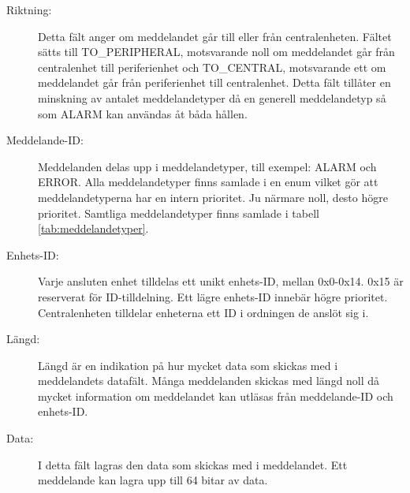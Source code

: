 \documentclass[a4paper]{article}
\begin{document}
\begin{description}
    \item[Riktning:] Detta fält anger om meddelandet går till eller från centralenheten.
    Fältet sätts till TO\_PERIPHERAL, motsvarande noll om meddelandet går från centralenhet till periferienhet och TO\_CENTRAL, motsvarande ett om meddelandet går från periferienhet till centralenhet.
    Detta fält tillåter en minskning av antalet meddelandetyper då en generell meddelandetyp så som ALARM kan användas åt båda hållen.

    \item[Meddelande-ID:] Meddelanden delas upp i meddelandetyper, till exempel: ALARM och ERROR. Alla meddelandetyper finns samlade i en enum vilket gör att meddelandetyperna har en intern prioritet. Ju närmare noll, desto högre prioritet. Samtliga meddelandetyper finns samlade i tabell \ref{tab:meddelandetyper}.

    \item[Enhets-ID:] Varje ansluten enhet tilldelas ett unikt enhets-ID, mellan 0x0-0x14. 0x15 är reserverat för ID-tilldelning. Ett lägre enhets-ID innebär högre prioritet.
    Centralenheten tilldelar enheterna ett ID i ordningen de anslöt sig i.

    \item[Längd:] Längd är en indikation på hur mycket data som skickas med i meddelandets datafält.
    Många meddelanden skickas med längd noll då mycket information om meddelandet kan utläsas från meddelande-ID och enhets-ID.

    \item[Data:] I detta fält lagras den data som skickas med i meddelandet. Ett meddelande kan lagra upp till 64 bitar av data.
\end{description}

\begin{table}[H]
    \centering
    \caption{Diagram över CAN-meddelandets uppbyggnad samt ett exemepl på hur ett alarm-meddelande från en periferienhet ser ut.}

\end{table}
\end{document}
